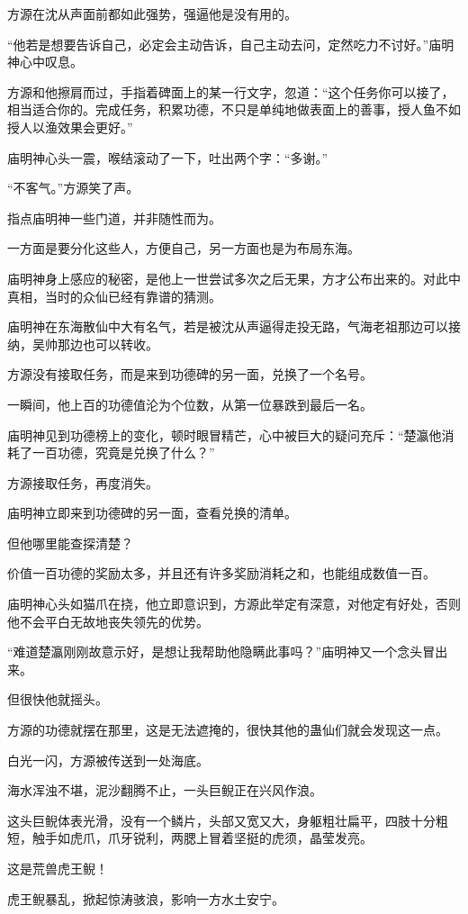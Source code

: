 \begin{this_body}
方源在沈从声面前都如此强势，强逼他是没有用的。

“他若是想要告诉自己，必定会主动告诉，自己主动去问，定然吃力不讨好。”庙明神心中叹息。

方源和他擦肩而过，手指着碑面上的某一行文字，忽道：“这个任务你可以接了，相当适合你的。完成任务，积累功德，不只是单纯地做表面上的善事，授人鱼不如授人以渔效果会更好。”

庙明神心头一震，喉结滚动了一下，吐出两个字：“多谢。”

“不客气。”方源笑了声。

指点庙明神一些门道，并非随性而为。

一方面是要分化这些人，方便自己，另一方面也是为布局东海。

庙明神身上感应的秘密，是他上一世尝试多次之后无果，方才公布出来的。对此中真相，当时的众仙已经有靠谱的猜测。

庙明神在东海散仙中大有名气，若是被沈从声逼得走投无路，气海老祖那边可以接纳，吴帅那边也可以转收。

方源没有接取任务，而是来到功德碑的另一面，兑换了一个名号。

一瞬间，他上百的功德值沦为个位数，从第一位暴跌到最后一名。

庙明神见到功德榜上的变化，顿时眼冒精芒，心中被巨大的疑问充斥：“楚瀛他消耗了一百功德，究竟是兑换了什么？”

方源接取任务，再度消失。

庙明神立即来到功德碑的另一面，查看兑换的清单。

但他哪里能查探清楚？

价值一百功德的奖励太多，并且还有许多奖励消耗之和，也能组成数值一百。

庙明神心头如猫爪在挠，他立即意识到，方源此举定有深意，对他定有好处，否则他不会平白无故地丧失领先的优势。

“难道楚瀛刚刚故意示好，是想让我帮助他隐瞒此事吗？”庙明神又一个念头冒出来。

但很快他就摇头。

方源的功德就摆在那里，这是无法遮掩的，很快其他的蛊仙们就会发现这一点。

白光一闪，方源被传送到一处海底。

海水浑浊不堪，泥沙翻腾不止，一头巨鲵正在兴风作浪。

这头巨鲵体表光滑，没有一个鳞片，头部又宽又大，身躯粗壮扁平，四肢十分粗短，触手如虎爪，爪牙锐利，两腮上冒着坚挺的虎须，晶莹发亮。

这是荒兽虎王鲵！

虎王鲵暴乱，掀起惊涛骇浪，影响一方水土安宁。


\end{this_body}
